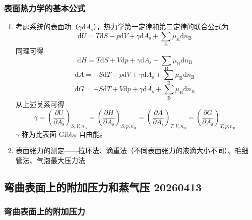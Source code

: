 \subsubsection{表面热力学的基本公式}

\begin{enumerate}
    \item 考虑系统的表面功（$ \gamma \mathrm{d} A_{\mathrm{s}} $），热力学第一定律和第二定律的联合公式为
    \begin{equation}
        \mathrm{d}U = T \mathrm{d}S - p \mathrm{d}V + \gamma \mathrm{d} A_{\mathrm{s}} + \sum_{{\mathrm{B}}}\mu_{\mathrm{B}} \mathrm{d}n_{\mathrm{B}}
    \end{equation}
    同理可得
    \begin{equation}
        \mathrm{d}H = T \mathrm{d}S + V \mathrm{d}p + \gamma \mathrm{d} A_{\mathrm{s}} + \sum_{{\mathrm{B}}}\mu_{\mathrm{B}} \mathrm{d}n_{\mathrm{B}}
    \end{equation}
    \begin{equation}
        \mathrm{d}A = -S \mathrm{d}T - p \mathrm{d}V + \gamma \mathrm{d} A_{\mathrm{s}} + \sum_{{\mathrm{B}}}\mu_{\mathrm{B}} \mathrm{d}n_{\mathrm{B}}
    \end{equation}
    \begin{equation}
        \mathrm{d}G = -S \mathrm{d}T + V \mathrm{d}p + \gamma \mathrm{d} A_{\mathrm{s}} + \sum_{{\mathrm{B}}}\mu_{\mathrm{B}} \mathrm{d}n_{\mathrm{B}}
    \end{equation}
    从上述关系可得
    \begin{equation}
        \gamma 
        = \left(\frac{\partial U}{\partial A_{\mathrm{s}}}\right)_{S, V, n_{\mathrm{B}}} 
        = \left(\frac{\partial H}{\partial A_{\mathrm{s}}}\right)_{S, p, n_{\mathrm{B}}} 
        = \left(\frac{\partial A}{\partial A_{\mathrm{s}}}\right)_{T, V, n_{\mathrm{B}}} 
        = \left(\frac{\partial G}{\partial A_{\mathrm{s}}}\right)_{T, p, n_{\mathrm{B}}} 
    \end{equation}
    $ \gamma $ 称为比表面 Gibbs 自由能。
    \item 表面张力的测定——拉环法、滴重法（不同表面张力的液滴大小不同）、毛细管法、气泡最大压力法 %
\end{enumerate}

\subsection{弯曲表面上的附加压力和蒸气压 20260413}

\subsubsection{弯曲表面上的附加压力}

